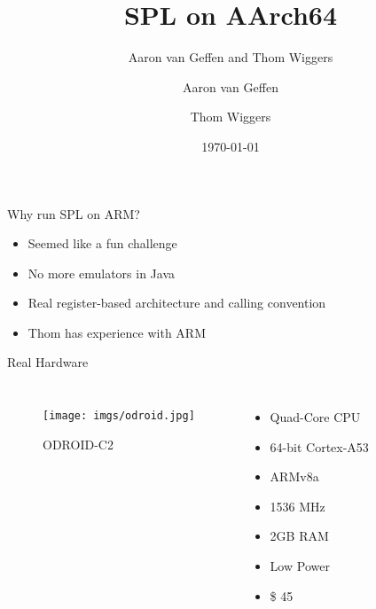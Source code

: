 \documentclass[department=icis, slidenumbers=slide, official=true]{beamerruhuisstijl}
\title{SPL on AArch64}
\subtitle{Aaron van Geffen and Thom Wiggers}
\date{\today}
\author{Aaron van Geffen \and Thom Wiggers}
\begin{document}
\begin{frame}
    \titlepage{}
\end{frame}

\begin{frame}{Why run SPL on ARM?}
    \begin{itemize}
        \item Seemed like a fun challenge
        \item No more emulators in Java
        \item Real register-based architecture and calling convention
        \item Thom has experience with ARM
    \end{itemize}
\end{frame}

\begin{frame}{Real Hardware}
    \begin{columns}
        \begin{figure}[h]
            \centering
            \texttt{[image: imgs/odroid.jpg]}
            \caption{ODROID-C2}\label{fig:odroid}
        \end{figure}

        \begin{itemize}
            \item Quad-Core CPU
            \item 64-bit Cortex-A53
            \item ARMv8a
            \item 1536 MHz
            \item 2GB RAM
            \item Low Power
            \item \$ 45
        \end{itemize}
    \end{columns}
\end{frame}
\end{document}
